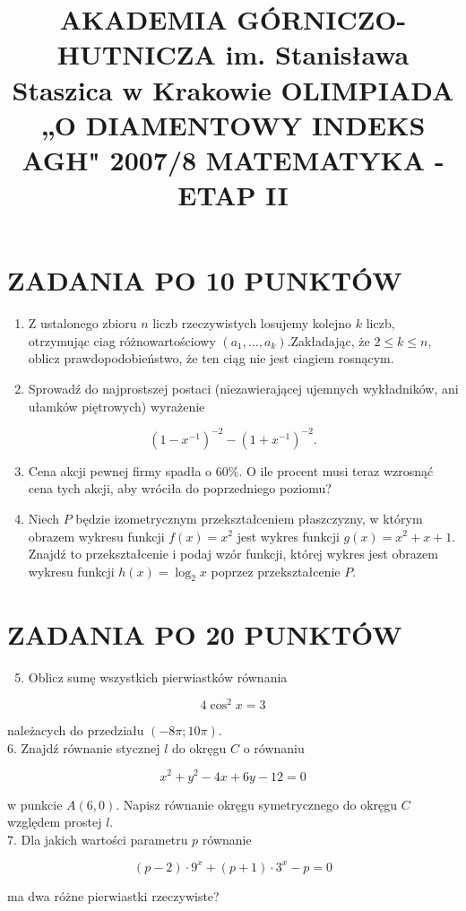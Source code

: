 \documentclass[10pt]{article}
\title{AKADEMIA GÓRNICZO-HUTNICZA im. Stanisława Staszica w Krakowie OLIMPIADA „O DIAMENTOWY INDEKS AGH" 2007/8 MATEMATYKA - ETAP II }
\author{}
\date{}
\begin{document}
\maketitle
\section*{ZADANIA PO 10 PUNKTÓW}
\begin{enumerate}
  \item Z ustalonego zbioru $n$ liczb rzeczywistych losujemy kolejno $k$ liczb, otrzymując ciag różnowartościowy $\left(a_{1}, \ldots, a_{k}\right)$.Zakładając, że $2 \leq k \leq n$, oblicz prawdopodobieństwo, że ten ciąg nie jest ciagiem rosnącym.
  \item Sprowadź do najprostszej postaci (niezawierającej ujemnych wykładników, ani ułamków piętrowych) wyrażenie
\end{enumerate}

$$
\left(1-x^{-1}\right)^{-2}-\left(1+x^{-1}\right)^{-2} .
$$

\begin{enumerate}
  \setcounter{enumi}{2}
  \item Cena akcji pewnej firmy spadła o $60 \%$. O ile procent musi teraz wzrosnąć cena tych akcji, aby wróciła do poprzedniego poziomu?
  \item Niech $P$ będzie izometrycznym przekształceniem płaszczyzny, w którym obrazem wykresu funkcji $f(x)=x^{2}$ jest wykres funkcji $g(x)=x^{2}+x+1$. Znajdź to przekształcenie i podaj wzór funkcji, której wykres jest obrazem wykresu funkcji $h(x)=\log _{2} x$ poprzez przekształcenie $P$.
\end{enumerate}

\section*{ZADANIA PO 20 PUNKTÓW}
\begin{enumerate}
  \setcounter{enumi}{4}
  \item Oblicz sumę wszystkich pierwiastków równania
\end{enumerate}

$$
4 \cos ^{2} x=3
$$

należacych do przedziału $(-8 \pi ; 10 \pi)$.\\
6. Znajdź równanie stycznej $l$ do okręgu $C$ o równaniu

$$
x^{2}+y^{2}-4 x+6 y-12=0
$$

w punkcie $A(6,0)$. Napisz równanie okręgu symetrycznego do okręgu $C$ względem prostej $l$.\\
7. Dla jakich wartości parametru $p$ równanie

$$
(p-2) \cdot 9^{x}+(p+1) \cdot 3^{x}-p=0
$$

ma dwa różne pierwiastki rzeczywiste?
\end{document}
